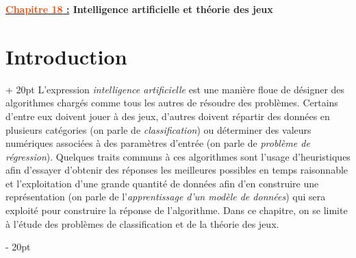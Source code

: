 \documentclass[a4paper, 12pt, twoside]{article}
\newcommand{\Emph}{\textcolor{ff4500}}
\newcommand{\ind}[1][20pt]{\advance\leftskip + #1}
\newcommand{\deind}[1][20pt]{\advance\leftskip - #1}
\newenvironment{indt}[2][20pt]{#2 \par \ind[#1]}{\par \deind} %
\newcommand{\thetitle}[2]{\begin{center}\textbf{{\LARGE \underline{\Emph{#1} :}} {\Large #2}}\end{center}}
\begin{document}
    
    \thetitle{Chapitre 18}{Intelligence artificielle et théorie des jeux}
    
    \tableofcontents
    \newpage
    
    \begin{indt}{\section{Introduction}}
        L'expression \emph{intelligence artificielle} est une manière floue de désigner des algorithmes chargés comme tous les autres de résoudre des problèmes.
        Certains d'entre eux doivent jouer à des jeux, d'autres doivent répartir des données en plusieurs catégories (on parle de \emph{classification}) ou déterminer des valeurs numériques associées à des paramètres d'entrée (on parle de \emph{problème de régression}).
        Quelques traits communs à ces algorithmes sont l'usage d'heuristiques afin d'essayer d'obtenir des réponses les meilleures possibles en temps raisonnable et l'exploitation d'une grande quantité de données afin d'en construire une représentation (on parle de l'\emph{apprentissage d'un modèle de données}) qui sera exploité pour construire la réponse de l'algorithme.
        Dans ce chapitre, on se limite à l'étude des problèmes de classification et de la théorie des jeux.
    \end{indt}

    \vspace{12pt}
    
\end{document}
